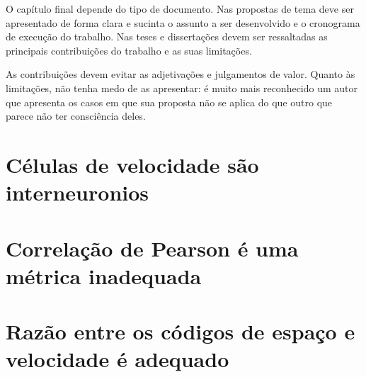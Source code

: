 
\label{Cap:conclusao}

O capítulo final depende do tipo de documento. Nas propostas de tema
deve ser apresentado de forma clara e sucinta o assunto a ser
desenvolvido e o cronograma de execução do trabalho. Nas teses e
dissertações devem ser ressaltadas as principais contribuições do
trabalho e as suas limitações.

As contribuições devem evitar as adjetivações e julgamentos de valor.
Quanto às limitações, não tenha medo de as apresentar: é muito mais
reconhecido um autor que apresenta os casos em que sua proposta não se
aplica do que outro que parece não ter consciência deles.

\section{Células de velocidade são interneuronios}

\section{Correlação de Pearson é uma métrica inadequada}

\section{Razão entre os códigos de espaço e velocidade é adequado}

